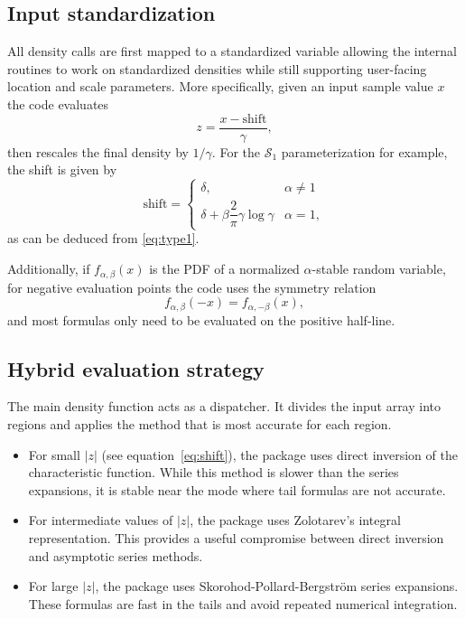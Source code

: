\subsection{Input standardization}

All density calls are first mapped to a standardized variable allowing the internal routines to work on standardized densities while still supporting user-facing location and scale parameters. More specifically, given an input sample value $x$ the code evaluates
\begin{equation}
z=\frac{x-\text{shift}}{\gamma},
\label{eq:shift}
\end{equation}
then rescales the final density by $1/\gamma$. For the $\mathcal{S}_1$ parameterization for example, the shift is given by \cite[equation 1.5]{NolanJohnP2020USDM}
\[
\text{shift} =
\begin{cases}
\delta, & \alpha \neq 1\\
\delta + \beta \dfrac{2}{\pi} \gamma \log \gamma & \alpha = 1,
\end{cases}
\]
as can be deduced from \cref{eq:type1}.

Additionally, if $f_{\alpha,\beta}(x)$ is the PDF of a normalized $\alpha$-stable random variable, for negative evaluation points the code uses the symmetry relation \cite[proposition 1.1]{NolanJohnP2020USDM}
\[
f_{\alpha,\beta}(-x)=f_{\alpha,-\beta}(x),
\]
and most formulas only need to be evaluated on the positive half-line.

\subsection{Hybrid evaluation strategy}

The main density function acts as a dispatcher. It divides the input array into regions and applies the method that is most accurate for each region.
\begin{itemize}
\item For small $|z|$ (see equation~\eqref{eq:shift}), the package uses direct inversion of the characteristic function. While this method is slower than the series expansions, it is stable near the mode where tail formulas are not accurate.
\item For intermediate values of $|z|$, the package uses Zolotarev's integral representation. This provides a useful compromise between direct inversion and asymptotic series methods.
\item For large $|z|$, the package uses Skorohod-Pollard-Bergstr{\"o}m series expansions. These formulas are fast in the tails and avoid repeated numerical integration.
\end{itemize}

